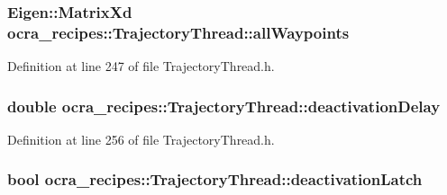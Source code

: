 \subsubsection[{\texorpdfstring{all\+Waypoints}{allWaypoints}}]{\setlength{\rightskip}{0pt plus 5cm}Eigen\+::\+Matrix\+Xd ocra\+\_\+recipes\+::\+Trajectory\+Thread\+::all\+Waypoints\hspace{0.3cm}{\ttfamily [protected]}}\hypertarget{classocra__recipes_1_1TrajectoryThread_a857686d75878a7ae4edf12e37fddb10c}{}\label{classocra__recipes_1_1TrajectoryThread_a857686d75878a7ae4edf12e37fddb10c}


Definition at line 247 of file Trajectory\+Thread.\+h.

\subsubsection[{\texorpdfstring{deactivation\+Delay}{deactivationDelay}}]{\setlength{\rightskip}{0pt plus 5cm}double ocra\+\_\+recipes\+::\+Trajectory\+Thread\+::deactivation\+Delay\hspace{0.3cm}{\ttfamily [protected]}}\hypertarget{classocra__recipes_1_1TrajectoryThread_a98ffdc4593f0608e8355654b54191c21}{}\label{classocra__recipes_1_1TrajectoryThread_a98ffdc4593f0608e8355654b54191c21}


Definition at line 256 of file Trajectory\+Thread.\+h.

\subsubsection[{\texorpdfstring{deactivation\+Latch}{deactivationLatch}}]{\setlength{\rightskip}{0pt plus 5cm}bool ocra\+\_\+recipes\+::\+Trajectory\+Thread\+::deactivation\+Latch\hspace{0.3cm}{\ttfamily [protected]}}\hypertarget{classocra__recipes_1_1TrajectoryThread_a5bdb397e0f051c99e563074946e01a82}{}\label{classocra__recipes_1_1TrajectoryThread_a5bdb397e0f051c99e563074946e01a82}


